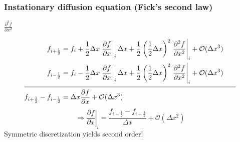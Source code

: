 \begin{frame}
  \frametitle{Instationary diffusion equation (Fick's second law)}
  $\displaystyle \frac{\partial^2f}{\partial x^2}$ \qquad
  \pause
  \begin{align*}
  f_{i+\frac{1}{2}} &= f_i + \frac{1}{2}\Delta x \left. \frac{\partial f}{\partial x}\right|_i \Delta x + \frac{1}{2}\left(\frac{1}{2}\Delta x\right)^2 \left. \frac{\partial^2 f}{\partial x^2} \right|_i +   \mathcal{O}{(\Delta x^3)}& \\
  f_{i-\frac{1}{2}} &= f_i - \frac{1}{2}\Delta x \left. \frac{\partial f}{\partial x}\right|_i \Delta x + \frac{1}{2}\left(\frac{1}{2}\Delta x\right)^2 \left. \frac{\partial^2 f}{\partial x^2} \right|_i +   \mathcal{O}{(\Delta x^3)}& \phantom{+}\\
    \cline{1-3}
    f_{i+\frac{1}{2}} -f_{i-\frac{1}{2}} &= \Delta x \frac{\partial f}{\partial x} + \mathcal{O}{(\Delta x^3)} & 
  \end{align*}
  \pause
  \[
    \Rightarrow \left. \frac{\partial f}{\partial x}\right|_i = \frac{f_{i+\frac{1}{2}} - f_{i-\frac{1}{2}}}{\Delta x} +  \mathcal{O}{(\Delta x^2)}
  \]
  Symmetric discretization yields second order!
\end{frame}

